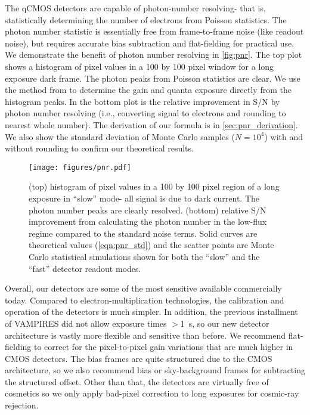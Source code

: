 The qCMOS detectors are capable of photon-number resolving- that is, statistically determining the number of electrons from Poisson statistics. The photon number statistic is essentially free from frame-to-frame noise (like readout noise), but requires accurate bias subtraction and flat-fielding for practical use. We demonstrate the benefit of photon number resolving in \autoref{fig:pnr}. The top plot shows a histogram of pixel values in a 100 by 100 pixel window for a long exposure dark frame. The photon peaks from Poisson statistics are clear. We use the method from \citet{starkey_determining_2016} to determine the gain and quanta exposure directly from the histogram peaks. In the bottom plot is the relative improvement in S/N by photon number resolving (i.e., converting signal to electrons and rounding to nearest whole number). The derivation of our formula is in \autoref{sec:pnr_derivation}. We also show the standard deviation of Monte Carlo samples ($N=10^4$) with and without rounding to confirm our theoretical results.

\begin{figure}
    \centering
    \texttt{[image: figures/pnr.pdf]}
    \caption{(top) histogram of pixel values in a 100 by 100 pixel region of a long exposure in ``slow'' mode- all signal is due to dark current. The photon number peaks are clearly resolved. (bottom) relative S/N improvement from calculating the photon number in the low-flux regime compared to the standard noise terms. Solid curves are theoretical values (\autoref{eqn:pnr_std}) and the scatter points are Monte Carlo statistical simulations shown for both the ``slow'' and the ``fast'' detector readout modes.\label{fig:pnr}}
\end{figure}

Overall, our detectors are some of the most sensitive available commercially today. Compared to electron-multiplication technologies, the calibration and operation of the detectors is much simpler. In addition, the previous installment of VAMPIRES did not allow exposure times $>$\SI{1}{s}, so our new detector architecture is vastly more flexible and sensitive than before. We recommend flat-fielding to correct for the pixel-to-pixel gain variations that are much higher in CMOS detectors. The bias frames are quite structured due to the CMOS architecture, so we also recommend bias or sky-background frames for subtracting the structured offset. Other than that, the detectors are virtually free of cosmetics so we only apply bad-pixel correction to long exposures for cosmic-ray rejection.

